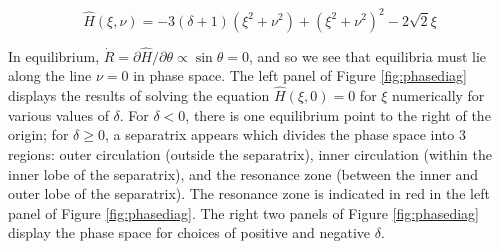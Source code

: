 \documentclass{mnras}
\renewcommand{\d}{\partial}
\begin{document}
\begin{equation}
  \hat H(\xi,\nu) = -3(\delta+1)(\xi^2+\nu^2) + (\xi^2+\nu^2)^2 -2\sqrt2
  \xi
\end{equation}

In equilibrium, \(\dot R = \d\hat H/\d\theta \propto \sin\theta= 0\),
and so we see that equilibria must lie along the line \(\nu=0\) in phase
space.  The left panel of Figure \ref{fig:phasediag} displays the
results of solving the equation \(\hat H(\xi, 0) = 0\) for \(\xi\)
numerically for various values of \(\delta\).  For \(\delta<0\), there is
one equilibrium point to the right of the origin; for \(\delta \geq 0\),
a separatrix appears which divides the phase space into 3 regions:
outer circulation (outside the separatrix), inner circulation (within
the inner lobe of the separatrix), and the resonance zone (between the
inner and outer lobe of the separatrix).  The resonance zone is
indicated in red in the left panel of Figure \ref{fig:phasediag}.  The
right two panels of Figure \ref{fig:phasediag} display the phase space
for choices of positive and negative \(\delta\).
\end{document}
